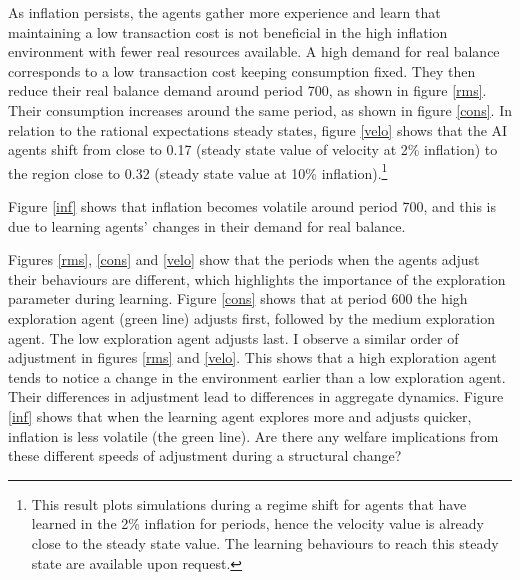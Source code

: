 \documentclass[hidelinks]{article}
\begin{document}
As inflation persists, the agents gather more experience and learn that maintaining a low transaction cost is not beneficial in the high inflation environment with fewer real resources available. A high demand for real balance corresponds to a low transaction cost keeping consumption fixed. They then reduce their real balance demand around period 700, as shown in figure \ref{rms}. Their consumption increases around the same period, as shown in figure \ref{cons}. In relation to the rational expectations steady states, figure \ref{velo} shows that the AI agents shift from close to 0.17 (steady state value of velocity at 2\% inflation) to the region close to 0.32 (steady state value at 10\% inflation).\footnote{This result plots simulations during a regime shift for agents that have learned in the 2\% inflation for periods, hence the velocity value is already close to the steady state value. The learning behaviours to reach this steady state are available upon request.} 

Figure \ref{inf} shows that inflation becomes volatile around period 700, and this is due to learning agents' changes in their demand for real balance. 

Figures \ref{rms}, \ref{cons} and \ref{velo} show that the periods when the agents adjust their behaviours are different, which highlights the importance of the exploration parameter during learning. Figure \ref{cons} shows that at period 600 the high exploration agent (green line) adjusts first, followed by the medium exploration agent. The low exploration agent adjusts last. I observe a similar order of adjustment in figures \ref{rms} and \ref{velo}. This shows that a high exploration agent tends to notice a change in the environment earlier than a low exploration agent. Their differences in adjustment lead to differences in aggregate dynamics. Figure \ref{inf} shows that when the learning agent explores more and adjusts quicker, inflation is less volatile (the green line). Are there any welfare implications from these different speeds of adjustment during a structural change? 


\end{document}
